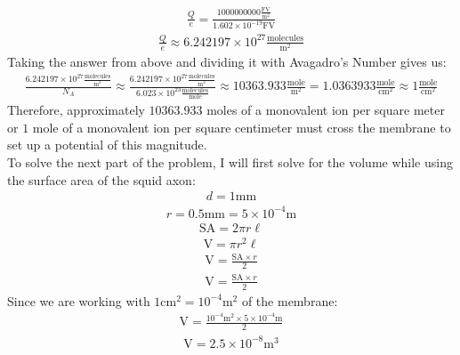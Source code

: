 \documentclass[11pt]{article}
\begin{document}
\begin{enumerate}[label=\arabic*.]
\begin{align*}
\frac{Q} {e} = \frac{1000000000 \frac{\text{FV}} {\text{m}^2}} {1.602 \times 10^{-19} \text{FV}}
\end{align*}
\begin{align*}
\frac{Q} {e} \approx 6.242197 \times 10^{27} \frac{\text{molecules}} {\text{m}^2}
\end{align*}
Taking the answer from above and dividing it with Avagadro's Number gives us:
\begin{align*}
\frac{6.242197 \times 10^{27} \frac{\text{molecules}} {\text{m}^2}} {N_A} \approx \frac{6.242197 \times 10^{27} \frac{\text{molecules}} {\text{m}^2}} {6.023 \times 10^{23} \frac{\text{molecules}} {\text{mole}}} \approx 10363.933 \frac{\text{mole}} {\text{m}^2} = 1.0363933 \frac{\text{mole}} {\text{cm}^2} \approx 1 \frac{\text{mole}} {\text{cm}^2}
\end{align*}
Therefore, approximately $10363.933$ moles of a monovalent ion per square meter or $1$ mole of a monovalent ion per square centimeter must cross the membrane to set up a potential of this magnitude.
\vspace*{1\baselineskip}
\\
To solve the next part of the problem, I will first solve for the volume while using the surface area of the squid axon:
\begin{align*}
d = 1 \text{mm}
\end{align*}
\begin{align*}
r = 0.5 \text{mm} = 5 \times 10^{-4} \text{m}
\end{align*}
\begin{align*}
\text{SA} = 2 \pi r \ell
\end{align*}
\begin{align*}
\text{V} = \pi r^2 \ell
\end{align*}
\begin{align*}
\text{V} = \frac{\text{SA} \times r} {2}
\end{align*}
\begin{align*}
\text{V} = \frac{\text{SA} \times r} {2}
\end{align*}
Since we are working with $1 \text{cm}^2 = 10^{-4} \text{m}^2$ of the membrane:
\begin{align*}
\text{V} = \frac{10^{-4} \text{m}^2 \times 5 \times 10^{-4} \text{m}} {2}
\end{align*}
\begin{align*}
\text{V} = 2.5 \times 10^{-8} \text{m}^3
\end{align*}

\end{enumerate}
\end{document}
